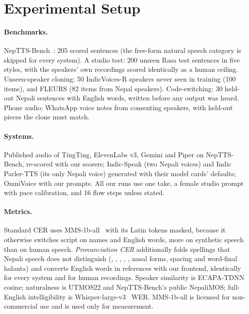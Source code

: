 \section{Experimental Setup}\label{sec:setup}

\paragraph{Benchmarks.} NepTTS-Bench~\citep{neptts}: 205 scored sentences (the free-form natural speech category is skipped for every system). A studio test: 200 unseen Rasa test sentences in five styles, with the speakers' own recordings scored identically as a human ceiling. Unseen-speaker cloning: 50 IndicVoices-R speakers never seen in training (100 items), and FLEURS (82 items from Nepal speakers). Code-switching: 30 held-out Nepali sentences with English words, written before any output was heard. Phone audio: WhatsApp voice notes from consenting speakers, with held-out pieces the clone must match.

\paragraph{Systems.} Published audio of TingTing, ElevenLabs v3, Gemini and Piper on NepTTS-Bench, re-scored with our scorers; Indic-Speak (two Nepali voices) and Indic Parler-TTS (its only Nepali voice) generated with their model cards' defaults; OmniVoice with our prompts. All our runs use one take, a female studio prompt with pace calibration, and 16 flow steps unless stated.

\paragraph{Metrics.} Standard CER uses MMS-1b-all~\citep{mms} with its Latin tokens masked, because it otherwise switches script on names and English words, more on synthetic speech than on human speech. \emph{Pronunciation CER} additionally folds spellings that Nepali speech does not distinguish (, , , , , nasal forms, spacing and word-final halanta) and converts English words in references with our frontend, identically for every system and for human recordings. Speaker similarity is ECAPA-TDNN cosine; naturalness is UTMOS22 and NepTTS-Bench's public NepaliMOS; full-English intelligibility is Whisper-large-v3~\citep{whisper} WER. MMS-1b-all is licensed for non-commercial use and is used only for measurement.
